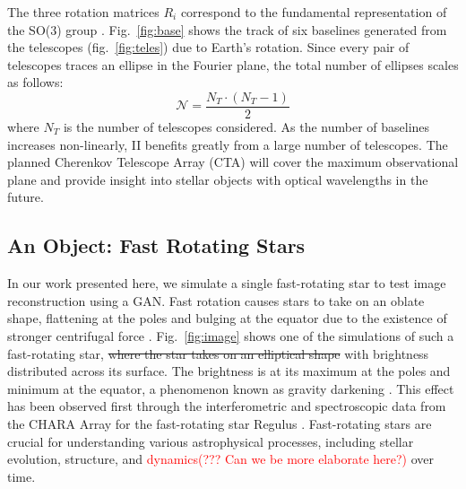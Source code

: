 The three rotation matrices $R_i$ correspond to the fundamental representation of the SO(3) group \cite{saha2020theory}. Fig.~\ref{fig:base} shows the track of six baselines generated from the telescopes (fig.~\ref{fig:teles}) due to Earth's rotation. Since every pair of telescopes traces an ellipse in the Fourier plane, the total number of ellipses scales as follows:
\begin{equation}
	\label{eq:N_telescopes}
	\mathcal{N} = \frac{N_T \cdot (N_T -1)}{2}
\end{equation}
where $N_T$ is the number of telescopes considered.
As the number of baselines increases non-linearly, II benefits greatly from a large number of telescopes. The planned Cherenkov Telescope Array (CTA) will cover the maximum observational plane and provide insight into stellar objects with optical wavelengths in the future.

\subsection{An Object: Fast Rotating Stars}
In our work presented here, we simulate a single fast-rotating star to test image reconstruction using a GAN. Fast rotation causes stars to take on an oblate shape, flattening at the poles and bulging at the equator due to the existence of stronger centrifugal force \cite{von1924radiative, 1999A&A...347..185M}. Fig.~\ref{fig:image} shows one of the simulations of such a fast-rotating star, \st{where the star takes on an elliptical shape} with brightness distributed across its surface. The brightness is at its maximum at the poles and minimum at the equator, a phenomenon known as gravity darkening \cite{lucy1967gravity}. This effect has been observed first through the interferometric and spectroscopic data from the CHARA Array for the fast-rotating star Regulus \cite{mcalister2005first}. Fast-rotating stars are crucial for understanding various astrophysical processes, including stellar evolution, structure, and \textcolor{red}{dynamics(??? Can we be more elaborate here?)} over time.

